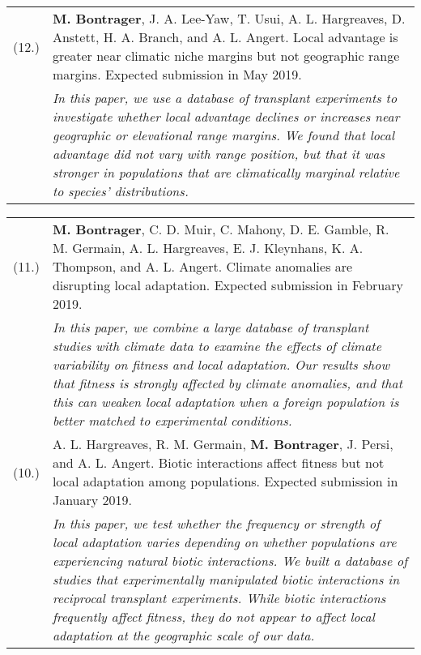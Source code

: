 \documentclass[letterpaper,11pt,oneside]{article}
\newcommand\hangbibentry[1]{%
    \smallskip\par\hangpara{1em}{1}\bibentry{#1}\smallskip\par 
}
\begin{document}
\def\arraystretch{1.2}
\noindent \begin{tabular}{@{} p{1cm} >{\raggedright\arraybackslash}p{15.11cm}}
(12.) & \textbf{M. Bontrager}, J. A. Lee-Yaw, T. Usui, A. L. Hargreaves, D. Anstett, H. A. Branch, and A. L. Angert. Local advantage is greater near climatic niche margins but not geographic range margins. Expected submission in May 2019. \\
 & \textit{In this paper, we use a database of transplant experiments to investigate whether local advantage declines or increases near geographic or elevational range margins. We found that local advantage did not vary with range position, but that it was stronger in populations that are climatically marginal relative to species' distributions.} \\
 \end{tabular}
 \def\arraystretch{1.2}
\noindent \begin{tabular}{@{} p{1cm} >{\raggedright\arraybackslash}p{15.11cm}}
(11.) & \textbf{M. Bontrager}, C. D. Muir, C. Mahony, D. E. Gamble, R. M. Germain, A. L. Hargreaves, E. J. Kleynhans, K. A. Thompson, and A. L. Angert. Climate anomalies are disrupting local adaptation. Expected submission in February 2019. \\
 & \textit{In this paper, we combine a large database of transplant studies with climate data to examine the effects of climate variability on fitness and local adaptation. Our results show that fitness is strongly affected by climate anomalies, and that this can weaken local adaptation when a foreign population is better matched to experimental conditions.} \\
(10.) & A. L. Hargreaves, R. M. Germain, \textbf{M. Bontrager}, J. Persi, and A. L. Angert. Biotic interactions affect fitness but not local adaptation among populations. Expected submission in January 2019.\\
 & \textit{In this paper, we test whether the frequency or strength of local adaptation varies depending on whether populations are experiencing natural biotic interactions. We built a database of studies that experimentally manipulated biotic interactions in reciprocal transplant experiments. While biotic interactions frequently affect fitness, they do not appear to affect local adaptation at the geographic scale of our data.} \\
\end{tabular}
\egroup
\bigskip
\bigskip
\end{document}
